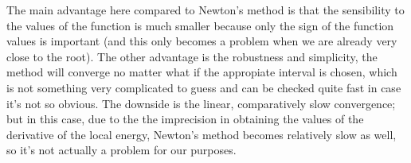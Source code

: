 		The main advantage here compared to Newton's method is that the sensibility to the values of the function is much smaller because only the sign of the function values is important (and this only becomes a problem when we are already very close to the root). The other advantage is the robustness and simplicity, the method will converge no matter what if the appropiate interval is chosen, which is not something very complicated to guess and can be checked quite fast in case it's not so obvious. The downside is the linear, comparatively slow convergence; but in this case, due to the the imprecision in obtaining the values of the derivative of the local energy, Newton's method becomes relatively slow as well, so it's not actually a problem for our purposes.\\
